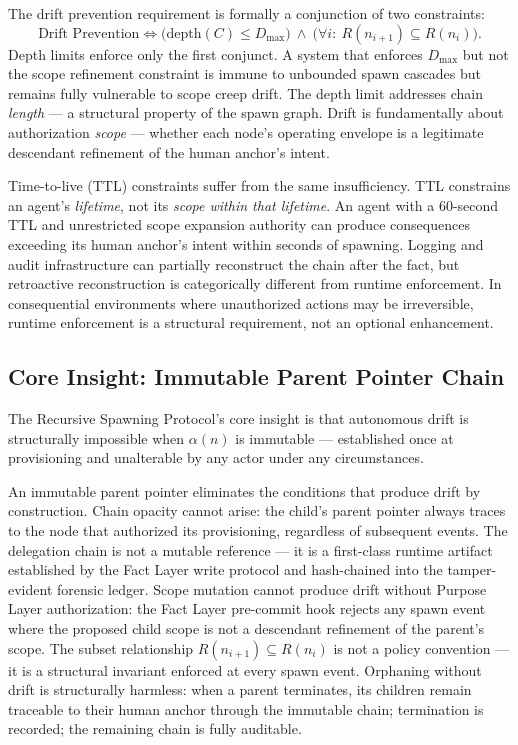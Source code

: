 The drift prevention requirement is formally a conjunction of two constraints:
\begin{equation}
\text{Drift Prevention} \iff \bigl( \text{depth}(C) \leq D_{\max} \bigr)\ \land\ \bigl( \forall i:\ R(n_{i+1}) \subseteq R(n_i) \bigr) .
\label{eq:intro-drift-prevention}
\end{equation}
Depth limits enforce only the first conjunct. A system that enforces $D_{\max}$ but not the scope refinement constraint is immune to unbounded spawn cascades but remains fully vulnerable to scope creep drift. The depth limit addresses chain \emph{length} — a structural property of the spawn graph. Drift is fundamentally about authorization \emph{scope} — whether each node's operating envelope is a legitimate descendant refinement of the human anchor's intent.

Time-to-live (TTL) constraints suffer from the same insufficiency. TTL constrains an agent's \emph{lifetime}, not its \emph{scope within that lifetime}. An agent with a 60-second TTL and unrestricted scope expansion authority can produce consequences exceeding its human anchor's intent within seconds of spawning. Logging and audit infrastructure can partially reconstruct the chain after the fact, but retroactive reconstruction is categorically different from runtime enforcement. In consequential environments where unauthorized actions may be irreversible, runtime enforcement is a structural requirement, not an optional enhancement.

\subsection{Core Insight: Immutable Parent Pointer Chain}

The Recursive Spawning Protocol's core insight is that autonomous drift is structurally impossible when $\alpha(n)$ is immutable — established once at provisioning and unalterable by any actor under any circumstances.

An immutable parent pointer eliminates the conditions that produce drift by construction. Chain opacity cannot arise: the child's parent pointer always traces to the node that authorized its provisioning, regardless of subsequent events. The delegation chain is not a mutable reference — it is a first-class runtime artifact established by the Fact Layer write protocol and hash-chained into the tamper-evident forensic ledger. Scope mutation cannot produce drift without Purpose Layer authorization: the Fact Layer pre-commit hook rejects any spawn event where the proposed child scope is not a descendant refinement of the parent's scope. The subset relationship $R(n_{i+1}) \subseteq R(n_i)$ is not a policy convention — it is a structural invariant enforced at every spawn event. Orphaning without drift is structurally harmless: when a parent terminates, its children remain traceable to their human anchor through the immutable chain; termination is recorded; the remaining chain is fully auditable.

